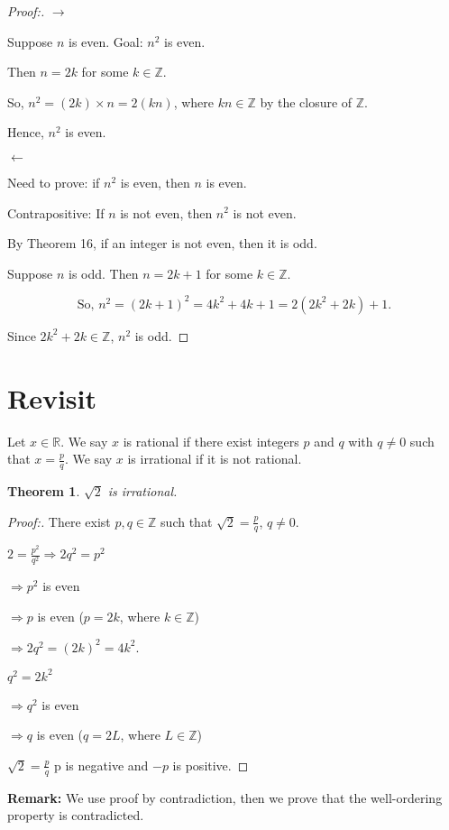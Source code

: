 \documentclass[12pt]{article}
\newtheorem{theorem}{Theorem}[section]
\begin{document}
\begin{proof}[Proof:]
\textbf{$\longrightarrow$}

Suppose $n$ is even. Goal: $n^2$ is even.

Then $n = 2k$ for some $k \in \mathbb{Z}$.

So, $n^2 = (2k) \times n = 2(kn)$, where $kn \in \mathbb{Z}$ by the closure of $\mathbb{Z}$.

Hence, $n^2$ is even.

\textbf{$\longleftarrow$}

Need to prove: if $n^2$ is even, then $n$ is even.

Contrapositive: If $n$ is not even, then $n^2$ is not even.

By Theorem 16, if an integer is not even, then it is odd.

Suppose $n$ is odd. Then $n = 2k + 1$ for some $k \in \mathbb{Z}$.

\[
\text{So, } n^2 = (2k + 1)^2 = 4k^2 + 4k + 1 = 2(2k^2 + 2k) + 1.
\]

Since $2k^2 + 2k \in \mathbb{Z}$, $n^2$ is odd.
\end{proof}

\newpage

\section{Revisit}

Let $x \in \mathbb{R}$. We say $x$ is rational if there exist integers $p$ and $q$ with $q \neq 0$ such that $x = \frac{p}{q}$. We say $x$ is irrational if it is not rational.

\begin{theorem}
$\sqrt{2}$ is irrational.
\end{theorem}

\begin{proof}[Proof:]
There exist $p, q \in \mathbb{Z}$ such that $\sqrt{2} = \frac{p}{q}$, $q \neq 0$.

$2 = \frac{p^2}{q^2} \Rightarrow 2q^2 = p^2$

$\Rightarrow p^2$ is even

$\Rightarrow p$ is even ($p = 2k$, where $k \in \mathbb{Z}$)

$\Rightarrow 2q^2 = (2k)^2 = 4k^2$.

$q^2 = 2k^2$

$\Rightarrow q^2$ is even

$\Rightarrow q$ is even ($q = 2L$, where $L \in \mathbb{Z}$)

$\sqrt{2} = \frac{p}{q}$ p is negative and $-p$ is positive.
\end{proof}

\textbf{Remark:} We use proof by contradiction, then we prove that the well-ordering property is contradicted.
\end{document}
